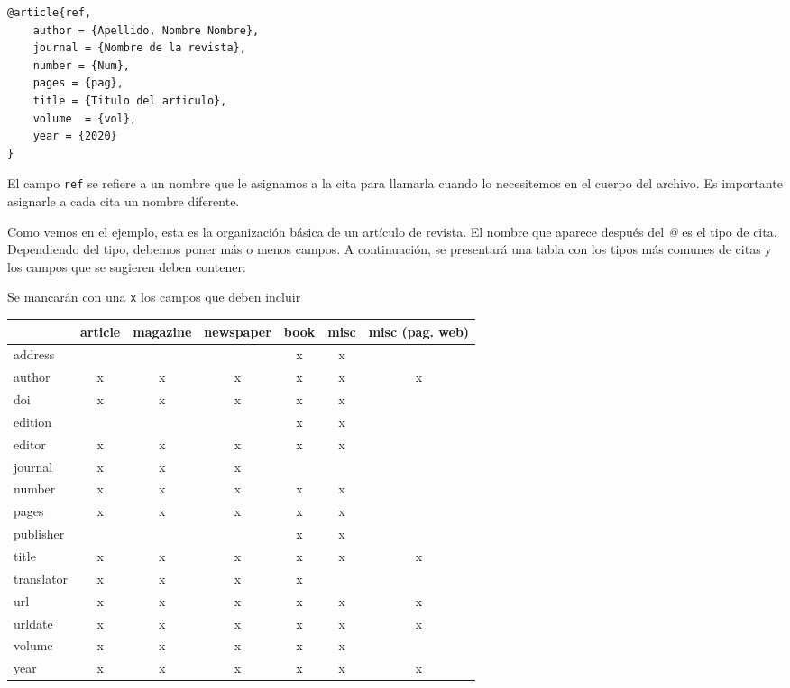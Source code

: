 	\begin{myquote}
		\begin{lstlisting}
@article{ref,
	author = {Apellido, Nombre Nombre},
	journal = {Nombre de la revista},
	number = {Num},
	pages = {pag},
	title = {Titulo del articulo},
	volume  = {vol},
	year = {2020}
}
		\end{lstlisting}
	\end{myquote}
	
	El campo \texttt{ref} se refiere a un nombre que le asignamos a la cita para llamarla cuando lo necesitemos en el cuerpo del archivo. Es importante asignarle a cada cita un nombre diferente.
	
	Como vemos en el ejemplo, esta es la organización básica de un artículo de revista. El nombre que aparece después del \textit{@} es el tipo de cita. Dependiendo del tipo, debemos poner más o menos campos. A continuación, se presentará una tabla con los tipos más comunes de citas y los campos que se sugieren deben contener:
	
	
	Se mancarán con una \texttt{x} los campos que deben incluir
	\begin{longtable}{|>{\ttfamily}l|c|c|c|c|c|c|}
		\hline
		\backslashbox{\textrm{Campos}}{\textrm{Tipo}} & article & magazine & newspaper & book & misc & misc (pag. web)\\
		\hline
		address & & & & x & x &\\
		\hline
		author & x & x & x & x & x & x\\
		\hline
		doi & x & x & x & x & x &\\
		\hline
		edition & & & & x & x &\\
		\hline
		editor & x & x & x & x & x &\\
		\hline
		journal & x & x & x & & &\\
		\hline
		number & x & x & x & x & x &\\
		\hline
		pages & x & x & x & x & x &\\
		\hline
		publisher & & & & x & x &\\
		\hline
		title & x & x & x & x & x & x\\
		\hline
		translator & x & x & x & x & &\\
		\hline
		url & x & x & x & x & x & x\\
		\hline
		urldate & x & x & x & x & x & x\\
		\hline
		volume & x & x & x & x & x &\\
		\hline
		year & x & x & x & x & x & x\\
		\hline				
	\end{longtable}

